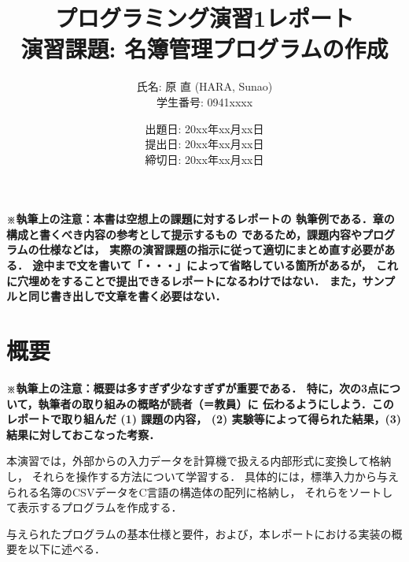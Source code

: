 \documentclass[a4j,11pt]{jarticle}
\title{プログラミング演習1レポート \\
       演習課題: 名簿管理プログラムの作成}
\author{氏名: 原 直 (HARA, Sunao) \\
        学生番号: 0941xxxx}
\date{出題日: 20xx年xx月xx日 \\
      提出日: 20xx年xx月xx日 \\
      締切日: 20xx年xx月xx日 \\}  %
\begin{document}
\maketitle

\textbf{\small※執筆上の注意：本書は空想上の課題に対するレポートの
    執筆例である．章の構成と書くべき内容の参考として提示するもの
    であるため，課題内容やプログラムの仕様などは，
    実際の演習課題の指示に従って適切にまとめ直す必要がある．
    途中まで文を書いて「・・・」によって省略している箇所があるが，
    これに穴埋めをすることで提出できるレポートになるわけではない．
    また，サンプルと同じ書き出しで文章を書く必要はない．}

\section{概要}

\textbf{\small※執筆上の注意：概要は多すぎず少なすぎずが重要である．
    特に，次の3点について，執筆者の取り組みの概略が読者（＝教員）に
    伝わるようにしよう．このレポートで取り組んだ (1) 課題の内容，
    (2) 実験等によって得られた結果，(3) 結果に対しておこなった考察．\\}

本演習では，外部からの入力データを計算機で扱える内部形式に変換して格納し，
それらを操作する方法について学習する．
具体的には，標準入力から与えられる名簿のCSVデータをC言語の構造体の配列に格納し，
それらをソートして表示するプログラムを作成する．

与えられたプログラムの基本仕様と要件，および，本レポートにおける実装の概要を以下に述べる．
\end{document}
